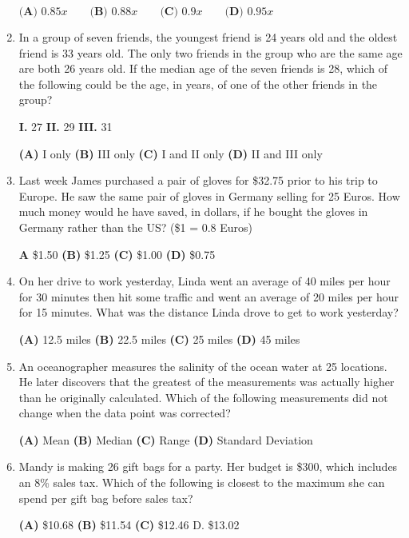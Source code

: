 \documentclass[../satmath.tex]{subfiles}
\begin{document}
\begin{enumerate}[label=\bfseries\arabic*.]
$\textbf{(A) } 0.85x \qquad \textbf{(B) } 0.88x \qquad \textbf{(C) } 0.9x \qquad \textbf{(D) } 0.95x$

\item In a group of seven friends, the youngest friend is 24 years old and the oldest friend is 33 years old. The only two friends in the group who are the 
same age are both 26 years old. If the median age of the seven friends is 28, which of the following could be the age, in years, of one of the other friends 
in the group?

\textbf{I.} 27 \qquad \textbf{II.} 29 \qquad \textbf{III.} 31

\textbf{(A) } I only \qquad \textbf{(B) } III only \textbf{(C) } I and II only \qquad \textbf{(D) } II and III only


\item Last week James purchased a pair of gloves for \$32.75 prior to his trip to Europe. He saw the same pair of gloves in Germany selling for 25 Euros.
How much money would he have saved, in dollars, if he bought the gloves in Germany rather than the US? (\$1 = 0.8 Euros)

\textbf{A} \$1.50 \qquad \textbf{(B) } \$1.25 \qquad \textbf{(C) } \$1.00 \qquad \textbf{(D) } \$0.75
 
\item On her drive to work yesterday, Linda went an average of 40 miles per hour for 30 minutes then hit some traffic and went an average 
of 20 miles per hour for 15 minutes. What was the distance Linda drove to get to work yesterday?

\textbf{(A) } 12.5 miles \qquad \textbf{(B) } 22.5 miles \qquad \textbf{(C) } 25 miles \qquad \textbf{(D) } 45 miles 
 
\item An oceanographer measures the salinity of the ocean water at 25 locations. He later discovers that the greatest of the measurements was 
actually higher than he originally calculated. Which of the following measurements did not change when the data point was corrected?

\textbf{(A) } Mean \qquad \textbf{(B) } Median \qquad \textbf{(C) } Range \qquad \textbf{(D) } Standard Deviation 

\item Mandy is making 26 gift bags for a party. Her budget is \$300, which includes an 8\% sales tax. Which of the following is closest to the 
maximum she can spend per gift bag before sales tax?

\textbf{(A) } \$10.68 \qquad \textbf{(B) } \$11.54 \qquad \textbf{(C) } \$12.46 \qquad D. \$13.02 


\end{enumerate}
\end{document}
